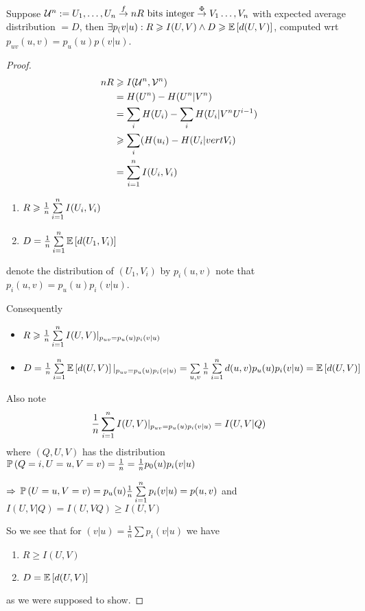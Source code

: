 \begin{theorem}
    Suppose $\mathcal{U}^n := U_1,\ldots,U_n \overset{f}{\to} nR \text{ bits integer} \overset{\Phi}{\to} V_1\ldots,V_n$ with expected average distribution $=D$, then $\exists p_(v\vert u) : R \geqslant I(U,V) \wedge D \geqslant \mathbb{E}\left[ d(U,V) \right]$, computed wrt $p_{uv}(u,v) = p_u(u)p(v\vert u)$.
\end{theorem}
\begin{proof}
    \[
        \begin{aligned}
            n R &\geqslant I(\mathcal{U}^n, \mathcal{V}^n)\\
            &= H(U^n) - H(U^n\vert V^n)\\
            &= \sum\limits_iH(U_i) - \sum_i H(U_i\vert V^nU^{i-1})\\
            &\geqslant \sum\limits_i (H(u_i) - H(U_i |vert V_i)\\
            &= \sum\limits_{i=1}^n I(U_i, V_i)
        \end{aligned}
    \]
    
    \begin{enumerate}
        \item $R \geqslant \frac{1}{n} \sum\limits_{i=1}^n I(U_i, V_i)$
        \item $D=\frac{1}{n} \sum\limits_{i=1}^n \mathbb{E}\left[ d(U_1, V_i) \right]$
    \end{enumerate}
    
    denote the distribution of $(U_1, V_i)$ by $p_i(u,v)$ note that $p_i(u,v) = p_u(u) p_i(v\vert u)$.
    
    Consequently 
    \begin{itemize}
        \item $R \geqslant \frac{1}{n} \sum\limits_{i=1}^n I(U,V) \vert_{p_{uv} = p_u(u) p_i(v\vert u)}$
        \item $D = \frac{1}{n} \sum\limits_{i=1}^n \mathbb{E}\left[ d(U,V) \right] \vert_{p_{uv} = p_u(u) p_i(v\vert u)} = \sum\limits_{u,v} \frac{1}{n} \sum\limits_{i=1}^n d(u,v) p_u(u) p_i(v\vert u) = \mathbb{E}\left[ d(U,V) \right]$
    \end{itemize}

    Also note
    \[
        \frac{1}{n} \sum\limits_{i=1}^nI(U,V)\vert_{p_{uv} = p_u(u)p_i(v\vert u)} = I(U,V \vert Q)
    \]
    where $(Q,U,V)$ has the distribution $\mathbb{P}\left( Q=i, U=u, V=v \right) = \frac{1}{n} = \frac{1}{n} p_0(u) p_i(v\vert u)$

    $\Rightarrow$ $\mathbb{P}\left( U=u, V=v \right) = p_u(u) \frac{1}{n} \sum\limits_{i=1}^n p_i(v\vert u) = p(u,v)$ and $I(U,V \vert Q) = I(U,VQ) \geqslant I(U,V)$
    
    So we see that for $(v\vert u) = \frac{1}{n} \sum p_i(v\vert u)$ we have
    \begin{enumerate}
        \item $R\geqslant I(U,V)$
        \item $D = \mathbb{E}\left[ d(U,V) \right]$
    \end{enumerate}
    as we were supposed to show.
\end{proof}

